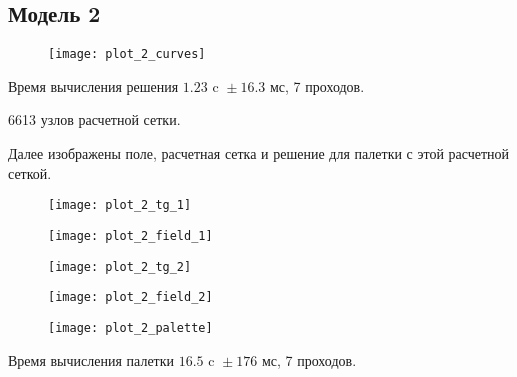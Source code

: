 \newpage
\subsection{Модель 2}

\begin{figure}[H]
\texttt{[image: plot\_2\_curves]}
\caption{}
\end{figure}

Время вычисления решения $1.23 \text{ c } \pm 16.3 \text{ мс}$, 7 проходов.

6613 узлов расчетной сетки.

Далее изображены поле, расчетная сетка и решение для палетки с этой расчетной сеткой.

\begin{figure}[H]
\centering
\texttt{[image: plot\_2\_tg\_1]}
\caption{}
\end{figure}

\begin{figure}[H]
\centering
\texttt{[image: plot\_2\_field\_1]}
\caption{}
\end{figure}

\begin{figure}[H]
\texttt{[image: plot\_2\_tg\_2]}
\caption{}
\end{figure}

\begin{figure}[H]
\texttt{[image: plot\_2\_field\_2]}
\caption{}
\end{figure}

\begin{figure}[H]
\texttt{[image: plot\_2\_palette]}
\caption{}
\end{figure}

Время вычисления палетки $16.5 \text{ c } \pm 176 \text{ мс}$, 7 проходов.

\clearpage
